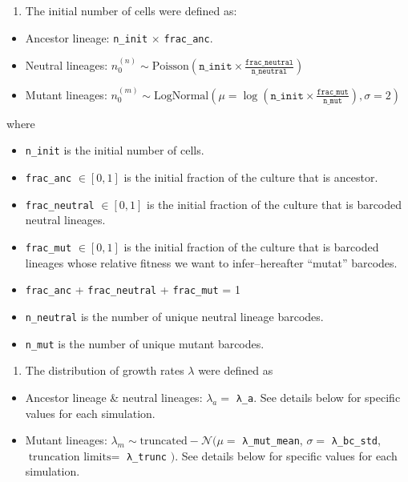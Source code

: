 \documentclass[
]{scrartcl}
\providecommand{\tightlist}{%
  \setlength{\itemsep}{0pt}\setlength{\parskip}{0pt}}\usepackage{longtable,booktabs,array}
\begin{document}
\begin{refsegment}
\begin{enumerate}
\def\labelenumi{\arabic{enumi}.}
\tightlist
\item
  The initial number of cells were defined as:
\end{enumerate}

\begin{itemize}
\tightlist
\item
  Ancestor lineage: \texttt{n\_init} \(\times\) \texttt{frac\_anc}.
\item
  Neutral lineages:
  \(n_0^{(n)} \sim \text{Poisson} \left(  \texttt{n\_init} \times \frac{\texttt{frac\_neutral}}{\texttt{n\_neutral}} \right)\)
\item
  Mutant lineages:
  \(n_0^{(m)} \sim \text{LogNormal} \left(  \mu = \log(\texttt{n\_init} \times \frac{\texttt{frac\_mut}}{\texttt{n\_mut}}),  \sigma = 2 \right)\)
\end{itemize}

where

\begin{itemize}
\tightlist
\item
  \texttt{n\_init} is the initial number of cells.
\item
  \texttt{frac\_anc} \(\in [0, 1]\) is the initial fraction of the
  culture that is ancestor.
\item
  \texttt{frac\_neutral} \(\in [0, 1]\) is the initial fraction of the
  culture that is barcoded neutral lineages.
\item
  \texttt{frac\_mut} \(\in [0, 1]\) is the initial fraction of the
  culture that is barcoded lineages whose relative fitness we want to
  infer--hereafter ``mutat'' barcodes.
\item
  \texttt{frac\_anc} + \texttt{frac\_neutral} + \texttt{frac\_mut} = 1
\item
  \texttt{n\_neutral} is the number of unique neutral lineage barcodes.
\item
  \texttt{n\_mut} is the number of unique mutant barcodes.
\end{itemize}

\begin{enumerate}
\def\labelenumi{\arabic{enumi}.}
\setcounter{enumi}{1}
\tightlist
\item
  The distribution of growth rates \(\lambda\) were defined as
\end{enumerate}

\begin{itemize}
\tightlist
\item
  Ancestor lineage \& neutral lineages: \(\lambda_a =\) \texttt{λ\_a}.
  See details below for specific values for each simulation.
\item
  Mutant lineages:
  \(\lambda_m \sim \text{truncated}-\mathcal{N}(  \mu =\)
  \texttt{λ\_mut\_mean}, \(\sigma =\) \texttt{λ\_bc\_std},
  \(\text{truncation limits} =\) \texttt{λ\_trunc} \()\). See details
  below for specific values for each simulation.
\end{itemize}


\end{refsegment}
\end{document}
